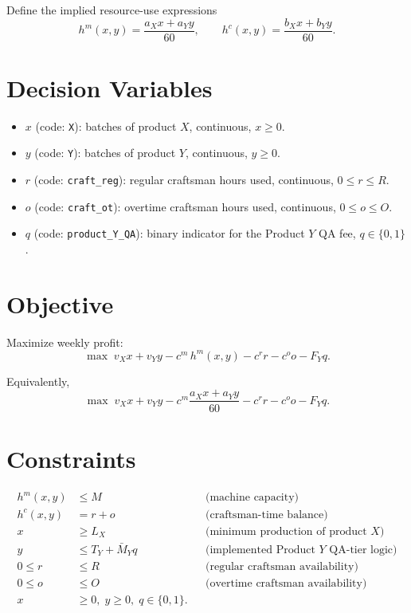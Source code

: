 Define the implied resource-use expressions
\[
h^m(x,y)=\frac{a_X x+a_Y y}{60}, \qquad
h^c(x,y)=\frac{b_X x+b_Y y}{60}.
\]

\section*{Decision Variables}

\begin{itemize}
    \item \(x\) (code: \texttt{X}): batches of product \(X\), continuous, \(x \ge 0\).
    \item \(y\) (code: \texttt{Y}): batches of product \(Y\), continuous, \(y \ge 0\).
    \item \(r\) (code: \texttt{craft\_reg}): regular craftsman hours used, continuous, \(0 \le r \le R\).
    \item \(o\) (code: \texttt{craft\_ot}): overtime craftsman hours used, continuous, \(0 \le o \le O\).
    \item \(q\) (code: \texttt{product\_Y\_QA}): binary indicator for the Product \(Y\) QA fee, \(q \in \{0,1\}\).
\end{itemize}

\section*{Objective}

Maximize weekly profit:
\[
\max \;
v_X x + v_Y y
- c^m \, h^m(x,y)
- c^r r
- c^o o
- F_Y q.
\]

Equivalently,
\[
\max \;
v_X x + v_Y y
- c^m \frac{a_X x+a_Y y}{60}
- c^r r
- c^o o
- F_Y q.
\]

\section*{Constraints}

\begin{align}
h^m(x,y) &\le M
&& \text{(machine capacity)} \\
h^c(x,y) &= r+o
&& \text{(craftsman-time balance)} \\
x &\ge L_X
&& \text{(minimum production of product \(X\))} \\
y &\le T_Y + \bar M_Y q
&& \text{(implemented Product \(Y\) QA-tier logic)} \\
0 \le r &\le R
&& \text{(regular craftsman availability)} \\
0 \le o &\le O
&& \text{(overtime craftsman availability)} \\
x &\ge 0,\; y \ge 0,\; q \in \{0,1\}. &&
\end{align}

